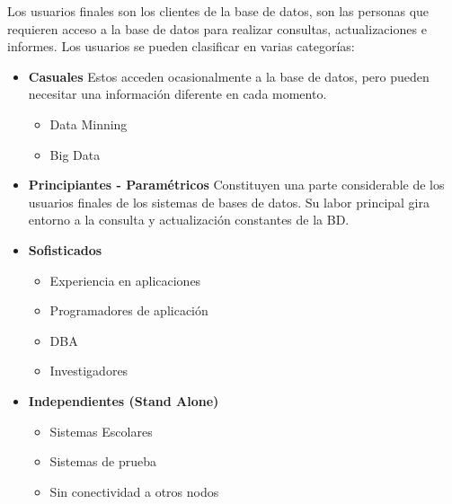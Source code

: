 \documentclass[12pt, fleqn]{report}                             %
\theoremstyle{break}                                            %
\begin{document}
                Los usuarios finales son los clientes de la base de datos, son las personas que
                requieren acceso a la base de datos para realizar consultas, actualizaciones e
                informes. Los usuarios se pueden clasificar en varias categorías:
                \begin{itemize}
                        \item
                            \textbf{Casuales}
                            Estos acceden ocasionalmente a la base de datos, pero pueden necesitar una
                            información diferente en cada momento.

                            \begin{itemize}
                                \item Data Minning
                                \item Big Data
                            \end{itemize}

                        \item 
                            \textbf{Principiantes - Paramétricos}
                            Constituyen una parte considerable de los usuarios finales de los
                            sistemas de bases de datos. Su labor principal gira entorno a la
                            consulta y actualización constantes de la BD.

                        \item 
                            \textbf{Sofisticados}
                            \begin{itemize}
                                \item Experiencia en aplicaciones 
                                \item Programadores de aplicación
                                \item DBA 
                                \item Investigadores
                             \end{itemize}
                            
                        \item 
                            \textbf{Independientes (Stand Alone)} 
                                \begin{itemize}
                                    \item Sistemas Escolares
                                    \item Sistemas de prueba
                                    \item Sin conectividad a otros nodos
                                \end{itemize}

                \end{itemize}
\end{document}
